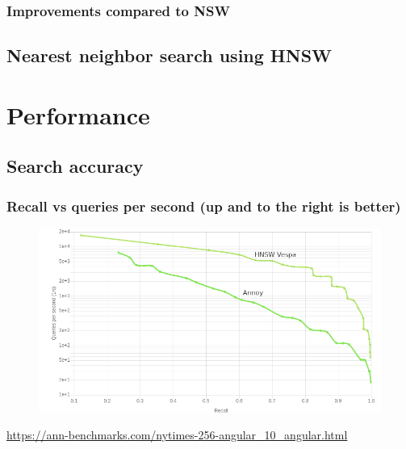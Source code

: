 \documentclass{beamer}
\begin{document}
  \begin{frame}
    \frametitle{Improvements compared to NSW}  
    \Large
   	\begin{itemize}
	\end{itemize} 
  \end{frame}
  
\subsection{Nearest neighbor search using HNSW}

  \section{Performance}
\subsection{Search accuracy}
  \begin{frame}
    \frametitle{Recall vs queries per second (up and to the right is better)}  
  \begin{figure}[annoy_vs_hnsw_vespa_recall_vs_queries_per_sec_nytimes_labels]
    \vspace*{-0.1cm}
  	\includegraphics[scale=0.3]{annoy_vs_hnsw_vespa_recall_vs_queries_per_sec_nytimes_labels} 	
  \end{figure} 
  \vspace{-0.3cm}
  \scriptsize \centering \url{https://ann-benchmarks.com/nytimes-256-angular_10_angular.html} 
  \end{frame}
\end{document}
